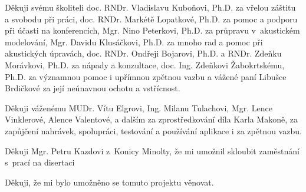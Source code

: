 Děkuji
svému školiteli doc. RNDr. Vladislavu Kuboňovi, Ph.D. za vřelou záštitu a svobodu při práci,
doc. RNDr. Markétě Lopatkové, Ph.D. za pomoc a podporu při účasti na konferencích,
Mgr. Nino Peterkovi, Ph.D. za průpravu v~akustickém modelování, 
Mgr. Davidu Klusáčkovi, Ph.D. za mnoho rad a pomoc při akustických úpravách,
doc. RNDr. Ondřeji Bojarovi, Ph.D.
a RNDr. Zdeňku Morávkovi, Ph.D. za nápady a konzultace,
doc. Ing. Zdeňkovi Žabokrtskému, Ph.D. za významnou pomoc i upřímnou zpětnou vazbu
a vážené paní Libušce Brdičkové za její neúnavnou ochotu a vstřícnost.

Děkuji
váženému MUDr. Vítu Elgrovi,
Ing. Milanu Tulachovi,
Mgr. Lence Vinklerové,
Alence Valentové,
a dalším za zprostředkování díla Karla Makoně, za zapůjčení nahrávek,
spolupráci, testování a používání aplikace i za zpětnou vazbu.

Děkuji
Mgr. Petru Kazdovi z~Konicy Minolty, že mi umožnil skloubit zaměstnání s~prací na disertaci

Děkuji, že mi bylo umožněno se tomuto projektu věnovat.
